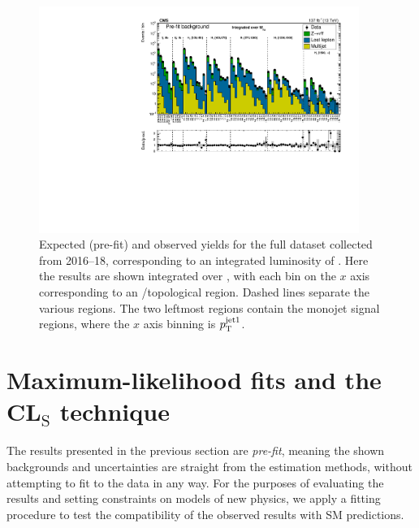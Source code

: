 \begin{figure}[htbp]
  \begin{center}
    \includegraphics[width=0.93\textwidth]{figs/results/prefit_inclusive.pdf}
    \caption{Expected (pre-fit) and observed yields for the full dataset collected from
      2016--18, corresponding to an integrated luminosity of \Lint. Here the results are shown
      integrated over \mttwo, with each bin on the $x$ axis corresponding to an \Nj/\Nb topological
      region. Dashed lines separate the various \Ht regions. The two leftmost regions contain the monojet
      signal regions, where the $x$ axis binning is $p_{\mathrm{T}}^{\mathrm{jet1}}$.
            }
    \label{fig:results_incl}
  \end{center}
\end{figure}


\section{Maximum-likelihood fits and the \texorpdfstring{CL$_\text{S}$}{CLs} technique}
\label{sec:fits}

The results presented in the previous section are \textit{pre-fit}, meaning the shown backgrounds
and uncertainties are straight from the estimation methods, without attempting to fit to the data
in any way. For the purposes of evaluating the results and setting constraints on models of new physics,
we apply a fitting procedure to test the compatibility of the observed results with SM predictions.

